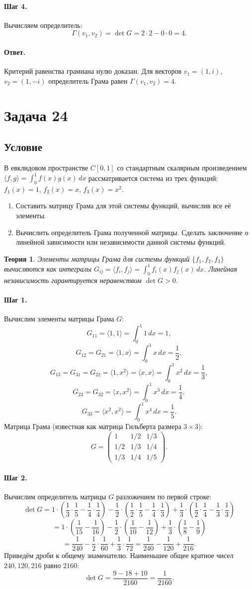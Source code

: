 \documentclass[12pt,a4paper]{article}
\theoremstyle{solution}
\newtheorem*{theory}{Теория}
\newcommand{\task}[1]{\newpage\section*{Задача #1}}
\newcommand{\answer}{\paragraph{Ответ.}}
\newcommand{\step}[1]{\paragraph{Шаг #1.}}
\begin{document}
\step{4} Вычисляем определитель:
\[
\Gamma(v_1, v_2) = \det G = 2\cdot 2 - 0\cdot 0 = 4.
\]

\answer
Критерий равенства грамиана нулю доказан. Для векторов $v_1 = (1, i)$, $v_2 = (1, -i)$ определитель Грама равен $\Gamma(v_1, v_2) = 4$.

\task{24}
\subsection*{Условие}
В евклидовом пространстве $C[0, 1]$ со стандартным скалярным произведением $\langle f, g\rangle = \int_0^1 f(x)g(x)\,dx$ рассматривается система из трех функций: $f_1(x) = 1$, $f_2(x) = x$, $f_3(x) = x^2$.
\begin{enumerate}
    \item Составить матрицу Грама для этой системы функций, вычислив все её элементы.
    \item Вычислить определитель Грама полученной матрицы. Сделать заключение о линейной зависимости или независимости данной системы функций.
\end{enumerate}

\begin{theory}
Элементы матрицы Грама для системы функций $\{f_1, f_2, f_3\}$ вычисляются как интегралы $G_{ij} = \langle f_i, f_j\rangle = \int_0^1 f_i(x)f_j(x)\,dx$. Линейная независимость гарантируется неравенством $\det G > 0$.
\end{theory}

\step{1} Вычислим элементы матрицы Грама $G$:
\[
G_{11} = \langle 1, 1\rangle = \int_0^1 1\,dx = 1,
\]
\[
G_{12} = G_{21} = \langle 1, x\rangle = \int_0^1 x\,dx = \frac{1}{2},
\]
\[
G_{13} = G_{31} = G_{22} = \langle 1, x^2\rangle = \langle x, x\rangle = \int_0^1 x^2\,dx = \frac{1}{3},
\]
\[
G_{23} = G_{32} = \langle x, x^2\rangle = \int_0^1 x^3\,dx = \frac{1}{4},
\]
\[
G_{33} = \langle x^2, x^2\rangle = \int_0^1 x^4\,dx = \frac{1}{5}.
\]
Матрица Грама (известная как матрица Гильберта размера $3\times3$):
\[
G = \begin{pmatrix} 1 & 1/2 & 1/3 \\ 1/2 & 1/3 & 1/4 \\ 1/3 & 1/4 & 1/5 \end{pmatrix}.
\]

\step{2} Вычислим определитель матрицы $G$ разложением по первой строке:
\[
\det G = 1 \cdot \left( \frac{1}{3}\cdot\frac{1}{5} - \frac{1}{4}\cdot\frac{1}{4} \right) - \frac{1}{2} \cdot \left( \frac{1}{2}\cdot\frac{1}{5} - \frac{1}{4}\cdot\frac{1}{3} \right) + \frac{1}{3} \cdot \left( \frac{1}{2}\cdot\frac{1}{4} - \frac{1}{3}\cdot\frac{1}{3} \right)
\]
\[
= 1 \cdot \left( \frac{1}{15} - \frac{1}{16} \right) - \frac{1}{2} \cdot \left( \frac{1}{10} - \frac{1}{12} \right) + \frac{1}{3} \cdot \left( \frac{1}{8} - \frac{1}{9} \right)
\]
\[
= \frac{1}{240} - \frac{1}{2} \cdot \frac{1}{60} + \frac{1}{3} \cdot \frac{1}{72} = \frac{1}{240} - \frac{1}{120} + \frac{1}{216}.
\]
Приведём дроби к общему знаменателю. Наименьшее общее кратное чисел $240, 120, 216$ равно $2160$:
\[
\det G = \frac{9 - 18 + 10}{2160} = \frac{1}{2160}.
\]
\end{document}
